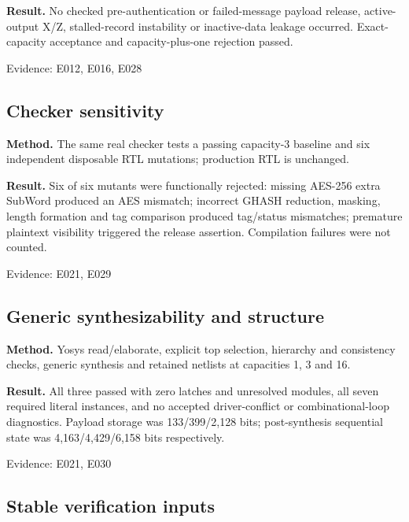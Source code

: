 \documentclass[11pt,a4paper]{article}
\begin{document}
\textbf{Result.} No checked pre-authentication or failed-message payload release,\allowbreak{} active-output X/\allowbreak{}Z,\allowbreak{} stalled-record instability or inactive-data leakage occurred. Exact-capacity acceptance and capacity-plus-one rejection passed.

{\small Evidence: E012,\allowbreak{} E016,\allowbreak{} E028}

\subsection{Checker sensitivity}

\textbf{Method.} The same real checker tests a passing capacity-3 baseline and six independent disposable RTL mutations; production RTL is unchanged.

\textbf{Result.} Six of six mutants were functionally rejected: missing AES-256 extra SubWord produced an AES mismatch; incorrect GHASH reduction,\allowbreak{} masking,\allowbreak{} length formation and tag comparison produced tag/\allowbreak{}status mismatches; premature plaintext visibility triggered the release assertion. Compilation failures were not counted.

{\small Evidence: E021,\allowbreak{} E029}

\subsection{Generic synthesizability and structure}

\textbf{Method.} Yosys read/\allowbreak{}elaborate,\allowbreak{} explicit top selection,\allowbreak{} hierarchy and consistency checks,\allowbreak{} generic synthesis and retained netlists at capacities 1,\allowbreak{} 3 and 16.

\textbf{Result.} All three passed with zero latches and unresolved modules,\allowbreak{} all seven required literal instances,\allowbreak{} and no accepted driver-conflict or combinational-loop diagnostics. Payload storage was 133/\allowbreak{}399/\allowbreak{}2,\allowbreak{}128 bits; post-synthesis sequential state was 4,\allowbreak{}163/\allowbreak{}4,\allowbreak{}429/\allowbreak{}6,\allowbreak{}158 bits respectively.

{\small Evidence: E021,\allowbreak{} E030}

\subsection{Stable verification inputs}
\end{document}
